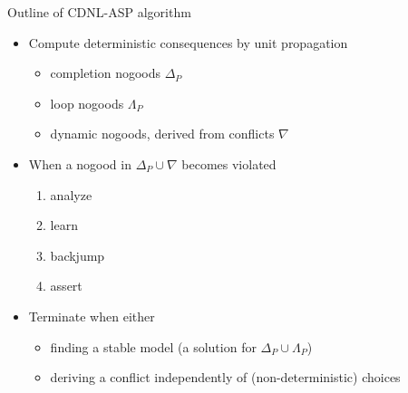 \begin{frame}{Outline of CDNL-ASP algorithm}
  \begin{itemize}
  \item<2-> Compute deterministic consequences by unit propagation
    \begin{itemize}
    \item completion nogoods                                         \hfill $\Delta_P$
    \item<2-5,7-> loop nogoods \hfill $\Lambda_P$\kern 1pt
    \item<3-> dynamic nogoods, derived from \alert<3>{conflicts} \hfill $\nabla\phantom{_P}$
    \end{itemize}
  \item<8-> When a nogood in $\Delta_P\cup\nabla$ becomes \alert<7>{violated}
    \begin{enumerate}
    \item<9-> \alert<9-13>{analyze}
    \item<9-> \alert<9-13>{learn}
    \item<9-> \alert<9-13>{backjump}
    \item<9-> \alert<9-13>{assert}
    \end{enumerate}
    \item<16-> Terminate when either
    \begin{itemize}
    \item<17-> finding a stable model (a solution for $\Delta_P\cup\Lambda_P$)
    \item<18-> deriving a conflict independently of (non-deterministic) choices
    \end{itemize}
  \end{itemize}
\end{frame}
